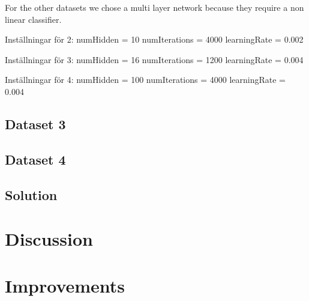 \documentclass{article}
\begin{document}
For the other datasets we chose a multi layer network because they
require a non linear classifier.

Inställningar för 2:
numHidden = 10
numIterations = 4000
learningRate = 0.002

Inställningar för 3:
numHidden = 16
numIterations = 1200
learningRate = 0.004

Inställningar för 4:
numHidden = 100
numIterations = 4000
learningRate = 0.004

\subsection{Dataset 3}
\subsection{Dataset 4}

\subsection{Solution}

\section{Discussion}

\section{Improvements}
\end{document}

